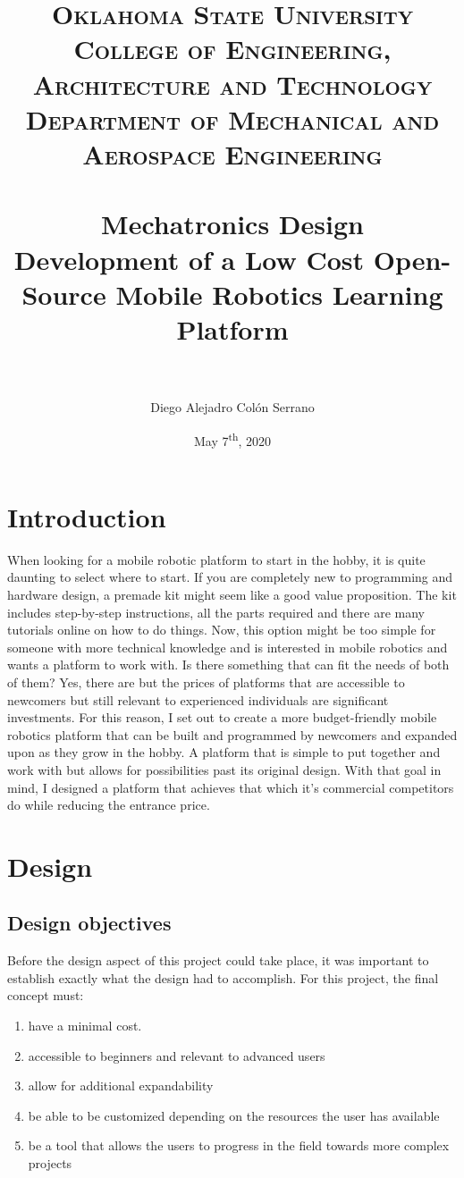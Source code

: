 \documentclass[12pt, letterpaper,titlepage]{article}
\title{	
\normalfont \normalsize 
\textsc{Oklahoma State University} \\ [25pt] 
\textsc{College of Engineering, Architecture and Technology} \\ [25pt]
\textsc{Department of Mechanical and Aerospace Engineering} \\ [25pt]
\horrule{0.5pt} \\[0.4cm] %
\huge  Mechatronics Design \\ 
\huge  Development of a Low Cost Open-Source Mobile Robotics Learning Platform\\
\horrule{0.5pt} \\[0.5cm] %
}
\author{Diego Alejadro Colón Serrano}
\date{May 7\textsuperscript{th}, 2020}
\begin{document}
\maketitle
\tableofcontents
\pagebreak

\section{Introduction}

	When looking for a mobile robotic platform to start in the hobby, it is quite daunting to select where to start. If you are completely new to programming and hardware design, a premade kit might seem like a good value proposition. The kit includes step-by-step instructions, all the parts required and there are many tutorials online on how to do things. Now, this option might be too simple for someone with more technical knowledge and is interested in mobile robotics and wants a platform to work with. Is there something that can fit the needs of both of them? Yes, there are but the prices of platforms that are accessible to newcomers but still relevant to experienced individuals are significant investments. For this reason, I set out to create a more budget-friendly mobile robotics platform that can be built and programmed by newcomers and expanded upon as they grow in the hobby. A platform that is simple to put together and work with but allows for possibilities past its original design. With that goal in mind, I designed a platform that achieves that which it's commercial competitors do while reducing the entrance price. 
\section{Design}

\subsection{Design objectives}

	Before the design aspect of this project could take place, it was important to establish exactly what the design had to accomplish. For this project, the final concept must:

	\begin{enumerate}
		\item have a minimal cost.
		\item accessible to beginners and relevant to advanced users
		\item allow for additional expandability
		\item be able to be customized depending on the resources the user has available
		\item be a tool that allows the users to progress in the field towards more complex projects
	\end{enumerate}
\end{document}
